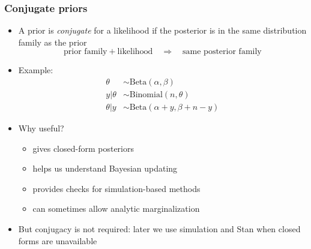 \documentclass[10pt]{beamer}
\begin{document}
\begin{frame}

  \frametitle{Conjugate priors}

  \begin{itemize}
  \item A prior is \emph{conjugate} for a likelihood if the posterior
    is in the same distribution family as the prior
    \[
      \text{prior family} + \text{likelihood}
      \quad \Rightarrow \quad
      \text{same posterior family}
    \]

  \pause
  \item Example:
    \[
      \begin{aligned}
      \theta &\sim \mathrm{Beta}(\alpha,\beta)\\
      y|\theta &\sim \mathrm{Binomial}(n,\theta)\\
      \theta|y &\sim \mathrm{Beta}(\alpha+y,\beta+n-y)
      \end{aligned}
    \]

  \pause
  \item Why useful?
    \begin{itemize}
    \item gives closed-form posteriors
    \item helps us understand Bayesian updating
    \item provides checks for simulation-based methods
    \item can sometimes allow analytic marginalization
    \end{itemize}

  \pause
  \item But conjugacy is not required: later we use simulation and Stan
    when closed forms are unavailable
  \end{itemize}

\end{frame}
\end{document}
